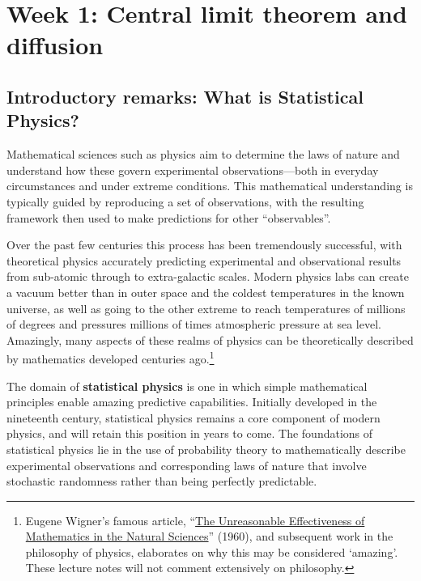 \renewcommand{\thisweek}{MATH327 Week 1}
\renewcommand{\moddate}{Last modified 30 Jan.~2021}
\setcounter{section}{1}
{}
\section*{Week 1: Central limit theorem and diffusion}

\subsection*{Introductory remarks: What is Statistical Physics?}
Mathematical sciences such as physics aim to determine the laws of nature and understand how these govern experimental observations---both in everyday circumstances and under extreme conditions.
This mathematical understanding is typically guided by reproducing a set of observations, with the resulting framework then used to make predictions for other ``observables''.

Over the past few centuries this process has been tremendously successful, with theoretical physics accurately predicting experimental and observational results from sub-atomic through to extra-galactic scales.
Modern physics labs can create a vacuum better than in outer space and the coldest temperatures in the known universe, as well as going to the other extreme to reach temperatures of millions of degrees and pressures millions of times atmospheric pressure at sea level.
Amazingly, many aspects of these realms of physics can be theoretically described by mathematics developed centuries ago.\footnote{Eugene Wigner's famous article, ``\href{https://en.wikipedia.org/wiki/The_Unreasonable_Effectiveness_of_Mathematics_in_the_Natural_Sciences}{The Unreasonable Effectiveness of Mathematics in the Natural Sciences}'' (1960), and subsequent work in the philosophy of physics, elaborates on why this may be considered `amazing'.  These lecture notes will not comment extensively on philosophy.}

The domain of \textbf{statistical physics} is one in which simple mathematical principles enable amazing predictive capabilities.
Initially developed in the nineteenth century, statistical physics remains a core component of modern physics, and will retain this position in years to come.
The foundations of statistical physics lie in the use of probability theory to mathematically describe experimental observations and corresponding laws of nature that involve stochastic randomness rather than being perfectly predictable.

